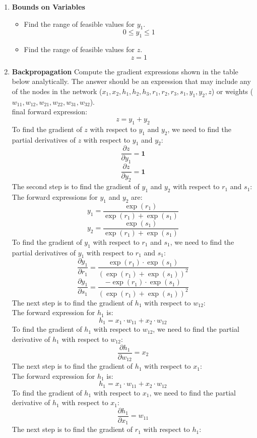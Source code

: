 \documentclass[a3paper,12pt]{extarticle} %
\begin{document}
\begin{enumerate}
\begin{enumerate}
\item \textbf{Bounds on Variables}
\begin{itemize}
    \item Find the range of feasible values for $y_1$.
    \[
    0 \leq y_1 \leq 1
    \]
    \item Find the range of feasible values for $z$.
    \[
    z = 1
    \]
\end{itemize}

\item \textbf{Backpropagation}
Compute the gradient expressions shown in the table below analytically. The answer should be an expression that may include any of the nodes in the network ($x_1, x_2, h_1, h_2, h_3, r_1, r_2, r_3, s_1, y_1, y_2, z$) or weights ($w_{11}, w_{12}, w_{21}, w_{22}, w_{31}, w_{32}$).
\\ final forward expression:
\[
z = y_1 + y_2
\]
To find the gradient of $z$ with respect to $y_1$ and $y_2$, we need to find the partial derivatives of $z$ with respect to $y_1$ and $y_2$:
\[
\frac{\partial z}{\partial y_1} = \textbf{1}
\]
\[
\frac{\partial z}{\partial y_2} = \textbf{1}
\]
The second step is to find the gradient of $y_1$ and $y_2$ with respect to $r_1$ and $s_1$:
\\ The forward expressions for $y_1$ and $y_2$ are:
\[
y_1 = \frac{\exp(r_1)}{\exp(r_1) + \exp(s_1)}
\]
\[
y_2 = \frac{\exp(s_1)}{\exp(r_1) + \exp(s_1)}
\]
To find the gradient of $y_1$ with respect to $r_1$ and $s_1$, we need to find the partial derivatives of $y_1$ with respect to $r_1$ and $s_1$:
\[
\frac{\partial y_1}{\partial r_1} = \frac{\exp(r_1) \cdot \exp(s_1)}{(\exp(r_1) + \exp(s_1))^2}
\]
\[
\frac{\partial y_1}{\partial s_1} = \frac{-\exp(r_1) \cdot \exp(s_1)}{(\exp(r_1) + \exp(s_1))^2}
\]
The next step is to find the gradient of $h_1$ with respect to $w_{12}$:
\\ The forward expression for $h_1$ is: 
\[
h_1 = x_1 \cdot w_{11} + x_2 \cdot w_{12}
\]
To find the gradient of $h_1$ with respect to $w_{12}$, we need to find the partial derivative of $h_1$ with respect to $w_{12}$:
\[
\frac{\partial h_1}{\partial w_{12}} = x_2
\]
The next step is to find the gradient of $h_1$ with respect to $x_1$:
\\ The forward expression for $h_1$ is:
\[
h_1 = x_1 \cdot w_{11} + x_2 \cdot w_{12}
\]
To find the gradient of $h_1$ with respect to $x_1$, we need to find the partial derivative of $h_1$ with respect to $x_1$:
\[
\frac{\partial h_1}{\partial x_1} = w_{11}
\]
The next step is to find the gradient of $r_1$ with respect to $h_1$:

\end{enumerate}
\end{enumerate}
\end{document}
